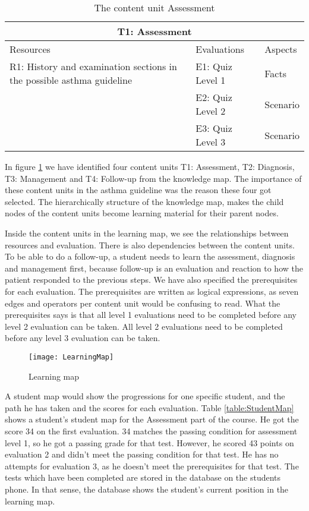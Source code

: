 \begin{table}[h!]
	\caption{The content unit Assessment}
	\label{table:ContentUnit}
\begin{tabular}{ | m{16em} | m{10em}| m{6em} | } 
	\hline
	\multicolumn{3}{c}{\bfseries T1: Assessment} \\
	\hline
	Resources & Evaluations & Aspects \\
	\hline
	R1: History and examination sections in the possible asthma guideline \parencite{RepublicofKeny2016} & E1: Quiz Level 1 & Facts \\
	& E2: Quiz Level 2 & Scenario \\
	& E3: Quiz Level 3 & Scenario \\
	\hline
	\end{tabular}
\end{table}

In figure \ref{fig:LearningMap} we have identified four content units T1: Assessment, T2: Diagnosis, T3: Management and T4: Follow-up from the knowledge map. The importance of these content units in the asthma guideline \parencite{RepublicofKeny2016} was the reason these four got selected. The hierarchically structure of the knowledge map, makes the child nodes of the content units become learning material for their parent nodes.

Inside the content units in the learning map, we see the relationships between resources and evaluation. There is also dependencies between the content units. To be able to do a follow-up, a student needs to learn the assessment, diagnosis and management first, because follow-up is an evaluation and reaction to how the patient responded to the previous steps.  We have also specified the prerequisites for each evaluation. The prerequisites are written as logical expressions, as seven edges and operators per content unit would be confusing to read. What the prerequisites says is that all level 1 evaluations need to be completed before any level 2 evaluation can be taken. All level 2 evaluations need to be completed before any level 3 evaluation can be taken.

\begin{figure}[h!]
	\caption {Learning map}
	\label{fig:LearningMap}
	\texttt{[image: LearningMap]}
\end{figure}

A student map would show the progressions for one specific student, and the path he has taken and the scores for each evaluation. Table \ref{table:StudentMap} shows a student's student map for the Assessment part of the course. He got the score 34 on the first evaluation. 34 matches the passing condition for assessment level 1, so he got a passing grade for that test. However, he scored 43 points on evaluation 2 and didn't meet the passing condition for that test. He has no attempts for evaluation 3, as he doesn't meet the prerequisites for that test.  The tests which have been completed are stored in the database on the students phone. In that sense, the database shows the student's current position in the learning map.

